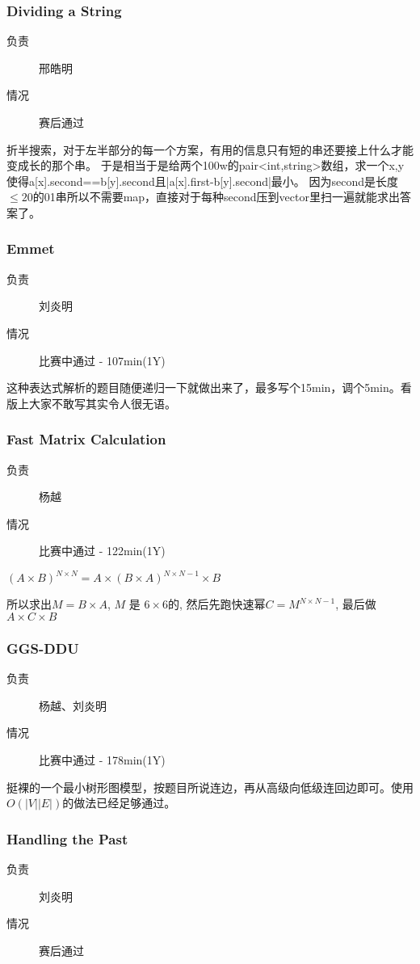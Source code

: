 \documentclass[a4paper, 11pt, nofonts, nocap, fancyhdr]{ctexart}
\newcommand{\problem}[1]{\subsubsection{#1}}
\begin{document}
\problem{Dividing a String}

\begin{description}
\item[负责] 邢皓明
\item[情况] 赛后通过
\end{description}

折半搜索，对于左半部分的每一个方案，有用的信息只有短的串还要接上什么才能变成长的那个串。
于是相当于是给两个100w的pair<int,string>数组，求一个x,y使得a[x].second==b[y].second且|a[x].first-b[y].second|最小。
因为second是长度$\leq 20$的01串所以不需要map，直接对于每种second压到vector里扫一遍就能求出答案了。

\problem{Emmet}

\begin{description}
\item[负责] 刘炎明
\item[情况] 比赛中通过 - 107min(1Y)
\end{description}

这种表达式解析的题目随便递归一下就做出来了，最多写个15min，调个5min。看版上大家不敢写其实令人很无语。

\problem{Fast Matrix Calculation}

\begin{description}
\item[负责] 杨越
\item[情况] 比赛中通过 - 122min(1Y)
\end{description}

$(A\times B)^{N\times N} = A\times (B\times A)^{N\times N - 1} \times B$

所以求出$M = B\times A$, $M$ 是 $6 \times 6$的, 然后先跑快速幂$C = M^{N\times N - 1}$, 最后做$A \times C \times B$

\problem{GGS-DDU}

\begin{description}
\item[负责] 杨越、刘炎明
\item[情况] 比赛中通过 - 178min(1Y)
\end{description}

挺裸的一个最小树形图模型，按题目所说连边，再从高级向低级连回边即可。使用$O(|V||E|)$的做法已经足够通过。

\problem{Handling the Past}

\begin{description}
\item[负责] 刘炎明
\item[情况] 赛后通过
\end{description}
\end{document}
